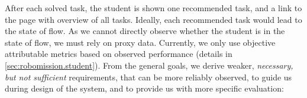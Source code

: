 After each solved task, the student is shown %
one recommended task, and a link to the page with overview of all tasks.
Ideally, each recommended task would lead to the state of flow.
As we cannot directly observe whether the student is in the state of flow,
we must rely on proxy data.
Currently, we only use objective attributable metrics based on observed performance
(details in \cref{sec:robomission.student}). %
From the general goals, we derive weaker,
\emph{necessary, but not sufficient} requirements, that can be more reliably observed,
to guide us during design of the system,
and to provide us with more specific evaluation:  %
